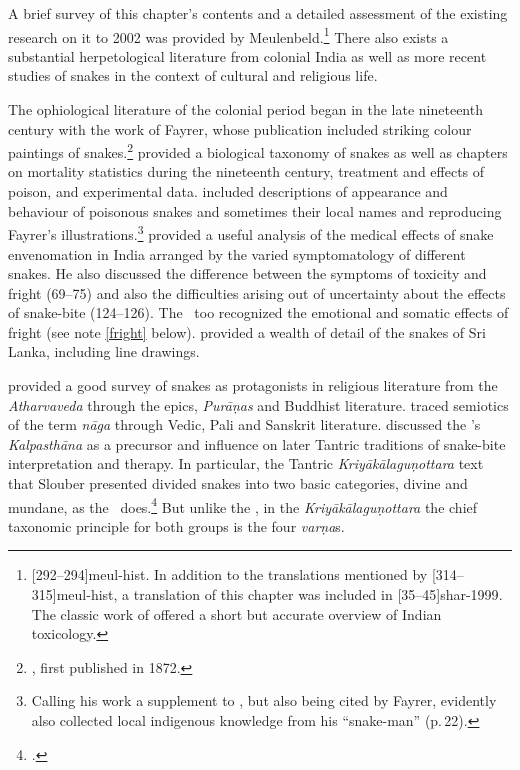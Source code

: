 A brief survey of this chapter's contents and a detailed assessment of
the existing research on it to 2002 was provided by
Meulenbeld.\footnote{[292--294]{meul-hist}. In addition to the
    translations mentioned by [314--315]{meul-hist}, a translation
    of this chapter was included in [35--45]{shar-1999}. The classic 
    work of \citet[\P93]{joll-1951} offered a short but accurate overview of 
    Indian toxicology.}  There
    also exists a substantial herpetological literature from colonial India
    as well as more recent studies of snakes in the context of cultural and
    religious life.



The ophiological literature of the colonial period began in the late
nineteenth century with the work of Fayrer, whose publication included
striking colour paintings of snakes.\footnote{\cite{fayr-1874}, first
    published in 1872.} \citeauthor{fayr-1874} provided a biological taxonomy
    of snakes as well as chapters on mortality statistics during the
    nineteenth century, treatment and effects of poison, and experimental
    data. \citet{ewar-1878} included descriptions of appearance and behaviour
    of poisonous snakes and sometimes their local names and reproducing
    Fayrer's illustrations.\footnote{Calling his work a supplement to
        \citet{fayr-1874}, but also being cited by Fayrer, \cite{ewar-1878}
        evidently also collected local indigenous knowledge from his “snake-man”
        (p.\,22).} \citet[75--124]{wall-1913} provided a useful analysis of the
        medical effects of snake envenomation in India arranged by the varied
        symptomatology of different snakes.  He also discussed the difference
        between the symptoms of toxicity and fright (69--75) and also the
        difficulties arising out of uncertainty about the effects of snake-bite
        (124--126).  The \SS\ too recognized the emotional and somatic effects of
        fright (see note \ref{fright} below). \citet{wall-1921} provided a wealth
        of detail of the snakes of Sri Lanka, including line drawings.
        
\citet{doni-2015} provided a good survey of snakes as protagonists in
religious literature from the \emph{Atharvaveda} through the epics,
\emph{Purāṇas} and Buddhist literature. \citet{seme-1979} traced
semiotics of the term \emph{nāga} through Vedic, Pali and Sanskrit
literature.  \citet[31--33 \emph{et passim}]{slou-2016} discussed the
\SS's \emph{Kalpasthāna} as a precursor and influence on later Tantric
traditions of snake-bite interpretation and therapy.  In particular,
the Tantric \emph{Kriyākālaguṇottara} text that Slouber presented
divided snakes into two basic categories, divine and mundane, as the
\SS\ does.\footcite[144--145]{slou-2016}  But unlike the \SS, in the
\emph{Kriyākālaguṇottara} the chief taxonomic principle for both
groups is the four \emph{varṇa}s.   
    
